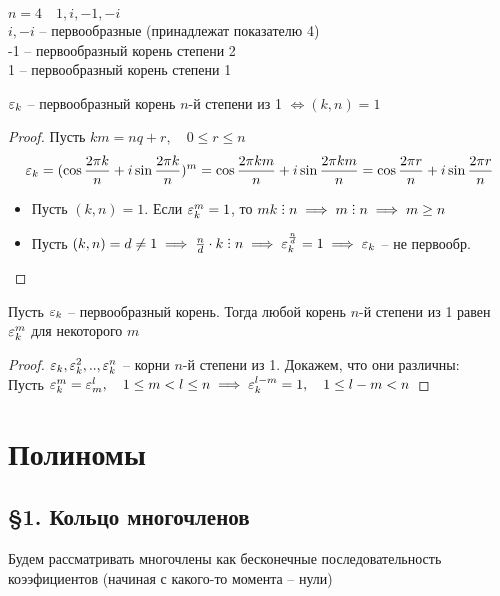 \begin{eg}
	$ n = 4 \quad 1, i, -1, -i $ \\
    $i, -i $ -- первообразные (принадлежат показателю 4) \\
    -1 -- первообразный корень степени 2 \\
    1 -- первообразный корень степени 1
\end{eg}

\begin{props}
    \item $\varepsilon_k$ -- первообразный корень $n$-й степени из 1 $ \iff (k,n) = 1 $
    \begin{proof}
    	Пусть $km = nq + r, \quad 0 \le r \le n $
        $$ \varepsilon_k = (\cos \frac{2 \pi k}n + i \sin \frac{2 \pi k}n)^m = \cos \frac{2 \pi k m}n + i \sin \frac{2 \pi k m}n = \cos \frac{2 \pi r}n + i \sin \frac{2 \pi r}n $$
        \begin{itemize}
        	\item Пусть $(k,n) = 1$. Если $\varepsilon_k^m = 1$, то $mk \divby n \implies m \divby n \implies m \ge n $
            \item Пусть $(k,n) = d \ne 1 \implies \frac{n}d \cdot k \divby n \implies \veps_k^{\frac{n}d} = 1 \implies \veps_k$ -- не первообр.
        \end{itemize}
    \end{proof}
    \item Пусть $\varepsilon_k$ -- первообразный корень. Тогда любой корень $n$-й степени из 1 равен $\varepsilon_k^m$ для некоторого $m$
    \begin{proof}
    	$\varepsilon_k, \varepsilon_k^2, .., \varepsilon_k^n$ -- корни $n$-й степени из 1. Докажем, что они различны: \\
        Пусть $\varepsilon_k^m = \varepsilon_m^l, \quad 1 \le m < l \le n \implies \varepsilon_k^{l-m} = 1, \quad 1 \le l-m < n $
    \end{proof}
\end{props}

\chapter{Полиномы}

\section{\S1. Кольцо многочленов}

Будем рассматривать многочлены как бесконечные последовательность коээфициентов (начиная с какого-то момента -- нули)

